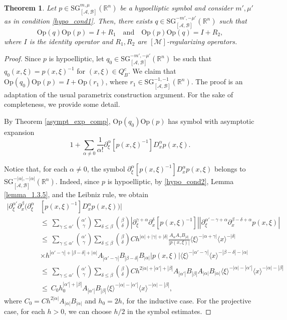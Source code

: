 \documentclass[11pt,reqno]{amsart}
\numberwithin{equation}{section}
\newtheorem{theorem}{Theorem}[section]
\newcommand{\R}{{\mathbb{R}}} %
\newcommand{\Op}{{\mathrm{Op}}}
\newcommand{\SG}{{\mathrm{SG}}}
\newcommand{\M}{{\mathcal{M}}} %
\newcommand{\A}{{\mathcal{A}}} %
\newcommand{\B}{{\mathcal{B}}} %
\begin{document}
\begin{theorem}\label{thm_para}
	Let $p\in {\SG}_{[\A,\B]}^{m,\mu}(\R^n)$ be a hypoelliptic symbol and consider $m',\mu'$ as in condition \eqref{hypo_cond1}. 
	Then, there exists $q\in {\SG}_{[\A,\B]}^{-m', -\mu'}(\R^n)$ such that
	\begin{equation*}
		\Op(q)\Op(p)=I+R_1\quad\text{and}\quad \Op(p)\Op(q)=I+R_2,
	\end{equation*}
	where $I$ is the identity operator and $R_1,R_2$ are $[\M]$-regularizing operators.
\end{theorem}
%
\begin{proof}
	Since $p$ is hypoelliptic, let $q_0\in {\SG}_{[\A,\B]}^{-m',-\mu'}(\R^n)$ be such that $q_0(x,\xi)=p(x,\xi)^{-1}$ for $(x,\xi)\in Q_B^c$. 
	We claim that $\Op(q_0)\Op(p)=I+\Op(r_1)$, where $r_1\in {\SG}_{[\A,\B]}^{-1,-1}(\R^n)$. 
	The proof is an adaptation of the usual parametrix construction argument. For the sake of completeness, we provide some detail.
	
	By Theorem \ref{asympt_exp_comp}, $\Op(q_0)\Op(p)$ has symbol with asymptotic expansion
	\[1+\sum_{\alpha\neq 0}\frac{1}{\alpha!}\partial_\xi^\alpha [p(x,\xi)^{-1}] D_x^\alpha p(x,\xi).\] 
	
	Notice that, for each $\alpha\neq 0$, the symbol $\partial_\xi^\alpha [p(x,\xi)^{-1}] D_x^\alpha p(x,\xi)$ belongs to 
	${\SG}_{[\A,\B]}^{-|\alpha|,-|\alpha|}(\R^n)$. Indeed, since $p$ is hypoelliptic, by \eqref{hypo_cond2}, Lemma \ref{lemma_1.3.5}, 
	and the Leibniz rule, we obtain
	\begin{align*}
		|\partial_\xi^{\alpha'}\partial_x^\beta(\partial_\xi^\alpha &[p(x,\xi)^{-1}] D_x^\alpha p(x,\xi))|\\
		&\leq\   \sum_{\gamma\leq\alpha'}\binom{\alpha'}{\gamma} \sum_{\delta\leq\beta}\binom{\beta}{\delta} 
		|\partial_\xi^{\gamma+\alpha}\partial_x^{\delta} [p(x,\xi)^{-1}]| |\partial_\xi^{\alpha'-\gamma+\alpha}\partial_x^{\beta-\delta+\alpha} p(x,\xi)|\\
		&\leq\ \sum_{\gamma\leq\alpha'}\binom{\alpha'}{\gamma} \sum_{\delta\leq\beta}\binom{\beta}{\delta} 
		Ch^{|\alpha|+|\gamma|+|\delta|}\frac{A_{\alpha}A_{\gamma}B_{|\delta|}}{|p(x,\xi)|}\langle\xi\rangle^{-|\alpha+\gamma|}\langle x\rangle^{-|\delta|}\\
		& \times h^{|\alpha'-\gamma|+|\beta-\delta|+|\alpha|}
		A_{|\alpha'-\gamma|}B_{|\beta-\delta|}B_{|\alpha|}|p(x,\xi)|\langle\xi\rangle^{-|\alpha'-\gamma|}\langle x\rangle^{-|\beta-\delta|-|\alpha|}\\
		&\leq\ \sum_{\gamma\leq\alpha'}\binom{\alpha'}{\gamma} \sum_{\delta\leq\beta}\binom{\beta}{\delta} 
		Ch^{2|\alpha|+|\alpha'|+|\beta|}A_{|\alpha'|}B_{|\beta|}A_{|\alpha|}B_{|\alpha|}\langle\xi\rangle^{-|\alpha|-|\alpha'|}\langle x\rangle^{-|\alpha|-|\beta|}\\
		&\leq\ C_0h_0^{|\alpha'|+|\beta|}A_{|\alpha'|}B_{|\beta|}\langle\xi\rangle^{-|\alpha|-|\alpha'|}\langle x\rangle^{-|\alpha|-|\beta|},
	\end{align*}
	where $C_0=Ch^{2|\alpha|}A_{|\alpha|}B_{|\alpha|}$ and $h_0=2h$, for the inductive case. 
	For the projective case, for each $h>0$, we can choose $h/2$ in the symbol estimates.
	

\end{proof}
\end{document}
